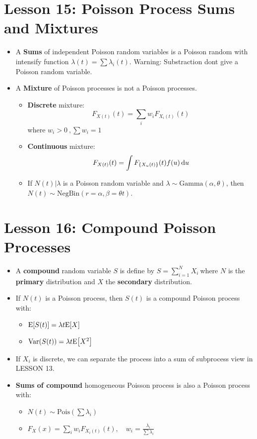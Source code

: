 \documentclass[10pt, french]{article}
\begin{document}
\begin{multicols*}{3}
\section*{Lesson 15: Poisson Process Sums and Mixtures}
\begin{itemize}[align=left,leftmargin=*]
    \item A \textbf{Sums} of independent Poisson random variables is a Poisson random with intensify function $\lambda(t)=\sum \lambda_i(t)$. {\color{red}Warning: Substraction dont give a Poisson random variable.} 
    \item A \textbf{Mixture} of Poisson processes is not a Poisson processes.
    \begin{itemize}
        \item \textbf{Discrete} mixture: \[ F_{X(t)}(t) = \sum_i w_i F_{X_i(t)}(t) \] where $w_i>0\:,\sum w_i = 1$
        \item \textbf{Continuous} mixture: \[ F_{X(t)}(t) = \int F_{\{X_u(t)\}}(t) f(u) \mathop{}\!\mathrm{d}{u} \]
        \item If $N(t)|\lambda$ is a Poisson random variable and $\lambda \sim \mathrm{Gamma}(\alpha, \theta)$, then $N(t) \sim \mathrm{NegBin}(r = \alpha, \beta = \theta t)$.
    \end{itemize}
\end{itemize}

\section*{Lesson 16: Compound Poisson Processes}
\begin{itemize}[align=left,leftmargin=*]
    \item A \textbf{compound} random variable $S$ is define by $S = \sum_{i=1}^N X_i\:$where $N$ is the \textbf{primary} distribution and $X$ the \textbf{secondary} distribution.
    \item If $N(t)$ is a Poisson process, then $S(t)$ is a compound Poisson process with:
    \begin{itemize}
        \item $\mathrm{E} {\left[ S(t) \right]} =  \lambda t \mathrm{E} {\left[ X \right]}$
        \item $\mathrm{Var} {\left( S(t) \right)} = \lambda t \mathrm{E} {\left[ X^2 \right]}$
    \end{itemize}
    \item If $X_i$ is discrete, we can separate the process into a sum of subprocess view in LESSON 13.
    \item \textbf{Sums of compound} homogeneous Poisson process is also a Poisson process with:
    \begin{itemize}
        \item $N(t)\sim\textrm{Pois}(\sum \lambda_i)$
        \item $F_X(x)=\sum_i w_i F_{X_i(t)}(t),\quad w_i = \frac{\lambda_i}{\sum \lambda_i}$
    \end{itemize}
\end{itemize}


\end{multicols*}
\end{document}
